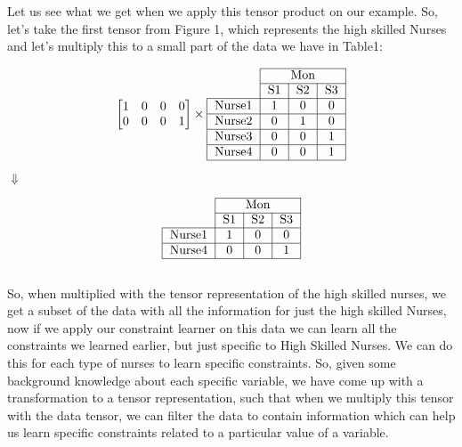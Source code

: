 \documentclass{article}
\begin{document}
Let us see what we get when we apply this tensor product on our example. So, let's take the first tensor from Figure 1, which represents the high skilled Nurses and let's multiply this to a small part of the data we have in Table1:

\[
\begin{bmatrix}
    1 & 0 & 0 & 0  \\
    0 & 0 & 0 & 1  
\end{bmatrix}
\times
\begin{tabular}{c|c|c|c|}
\cline{2-4}
\multicolumn{1}{l|}{}        & \multicolumn{3}{c|}{Mon} \\ \cline{2-4} 
\multicolumn{1}{l|}{}        & S1     & S2     & S3            \\ \hline
\multicolumn{1}{|c|}{Nurse1} & 1      & 0      & 0              \\ \hline
\multicolumn{1}{|c|}{Nurse2} & 0      & 1      & 0            \\ \hline
\multicolumn{1}{|c|}{Nurse3} & 0      & 0      & 1         \\ \hline
\multicolumn{1}{|c|}{Nurse4} & 0      & 0      & 1          \\ \hline
\end{tabular}
\]
\begin{center}
$\Downarrow$
\end{center}
\[
\begin{tabular}{c|c|c|c|}
\cline{2-4}
\multicolumn{1}{l|}{}        & \multicolumn{3}{c|}{Mon} \\ \cline{2-4} 
\multicolumn{1}{l|}{}        & S1     & S2     & S3            \\ \hline
\multicolumn{1}{|c|}{Nurse1} & 1      & 0      & 0              \\ \hline
\multicolumn{1}{|c|}{Nurse4} & 0      & 0      & 1          \\ \hline
\end{tabular}
\] 
\\
So, when multiplied with the tensor representation of the high skilled nurses, we get a subset of the data with all the information for just the high skilled Nurses, now if we apply our constraint learner on this data we can learn all the constraints we learned earlier, but just specific to High Skilled Nurses. We can do this for each type of nurses to learn specific constraints.
\newline
\newline
So, given some background knowledge about each specific variable, we have come up with a transformation to a tensor representation, such that when we multiply this tensor with the data tensor, we can filter the data to contain information which can help us learn specific constraints related to a particular value of a variable.
\end{document}
